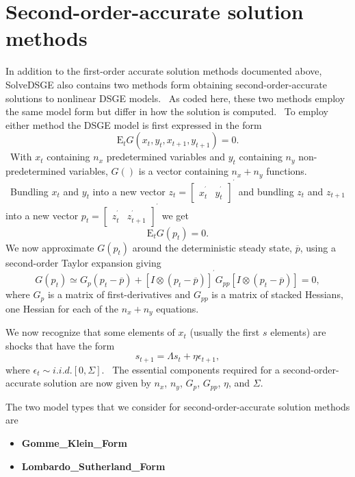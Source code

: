 \documentclass[thmsa,notitlepage,11pt]{article}
\begin{document}
\section{Second-order-accurate solution methods}

In addition to the first-order accurate solution methods documented above,
SolveDSGE also contains two methods form obtaining second-order-accurate
solutions to nonlinear DSGE models. \ As coded here, these two methods
employ the same model form but differ in how the solution is computed. \ To
employ either method the DSGE model is first expressed in the form%
\[
\text{E}_{t}G\left( x_{t},y_{t},x_{t+1},y_{t+1}\right) =0. 
\]%
\ With $x_{t}$ containing $n_{x}$ predetermined variables and $y_{t}$
containing $n_{y}$ non-predetermined variables, $G()$ is a vector containing 
$n_{x}+n_{y}$ functions. \ Bundling $x_{t}$ and $y_{t}$ into a new vector $%
z_{t}=\left[ 
\begin{array}{cc}
x_{t}^{^{\prime }} & y_{t}^{^{\prime }}%
\end{array}%
\right] ^{^{\prime }}$ and bundling $z_{t}$ and $z_{t+1}$ into a new vector $%
p_{t}=\left[ 
\begin{array}{cc}
z_{t}^{^{\prime }} & z_{t+1}^{^{\prime }}%
\end{array}%
\right] ^{^{\prime }}$ we get%
\[
\text{E}_{t}G\left( p_{t}\right) =0. 
\]%
We now approximate $G\left( p_{t}\right) $ around the deterministic steady
state, $\overline{p}$, using a second-order Taylor expansion giving%
\[
G\left( p_{t}\right) \simeq G_{p}\left( p_{t}-\overline{p}\right) +\left[
I\otimes \left( p_{t}-\overline{p}\right) \right] ^{^{\prime }}G_{pp}\left[
I\otimes \left( p_{t}-\overline{p}\right) \right] =0, 
\]%
where $G_{p}$ is a matrix of first-derivatives and $G_{pp}$ is a matrix of
stacked Hessians, one Hessian for each of the $n_{x}+n_{y}$ equations.

We now recognize that some elements of $x_{t}$ (usually the first $s$
elements) are shocks that have the form%
\[
s_{t+1}=\Lambda s_{t}+\eta \epsilon _{t+1}, 
\]%
where $\epsilon _{t}\sim i.i.d.[0,\Sigma ]$. \ The essential components
required for a second-order-accurate solution are now given by $n_{x}$, $%
n_{y}$, $G_{p}$, $G_{pp}$, $\eta $, and $\Sigma $.

The two model types that we consider for second-order-accurate solution
methods are

\begin{itemize}
\item \textbf{Gomme\_Klein\_Form}

\item \textbf{Lombardo\_Sutherland\_Form}
\end{itemize}
\end{document}
